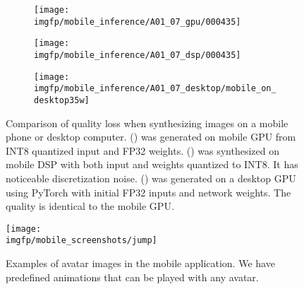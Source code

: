\begin{figure}[h]
	\centering
	\begin{subfigure}[b]{0.32\textwidth}
		\centering
		\texttt{[image: \\imgfp/mobile\_inference/A01\_07\_gpu/000435]}%
		\caption{}
		\label{fig:infer_gpu}
	\end{subfigure}
	\hfill
	\begin{subfigure}[b]{0.32\textwidth}
		\centering
		\texttt{[image: \\imgfp/mobile\_inference/A01\_07\_dsp/000435]}
		\caption{}
		\label{fig:infer_dsp}
	\end{subfigure}
	\hfill
	\begin{subfigure}[b]{0.32\textwidth}
		\centering
		\texttt{[image: \\imgfp/mobile\_inference/A01\_07\_desktop/mobile\_on\_desktop35w]}
		\caption{}
		\label{fig:infer_desktop}
	\end{subfigure}
	\caption{Comparison of quality loss when synthesizing images on a mobile phone or desktop computer. (\protect{}) was generated on mobile GPU from INT8 quantized input and FP32 weights. (\protect{}) was synthesized on mobile DSP with both input and weights quantized to INT8. It has noticeable discretization noise. (\protect{}) was generated on a desktop GPU using PyTorch with initial FP32 inputs and network weights. The quality is identical to the mobile GPU.}
\end{figure}
\begin{figure}[hb]
	\centering
		\texttt{[image: \\imgfp/mobile\_screenshots/jump]}%
		\label{fig:avatar_jump}
	\caption{Examples of avatar images in the mobile application. We have predefined animations that can be played with any avatar.}
\end{figure}
